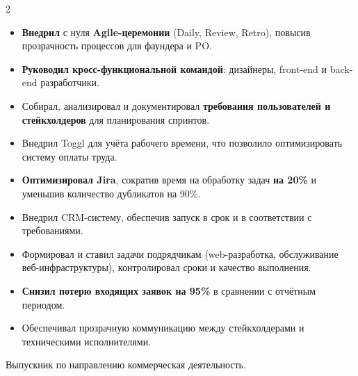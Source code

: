 \documentclass[10pt,a4paper,ragged2e,withhyper]{custom-altacv}
\begin{document}
\begin{paracol}{2}
\divider


\begin{itemize}
	\item \textbf{Внедрил} с нуля \textbf{Agile-церемонии} (Daily, Review, Retro), повысив прозрачность процессов для фаундера и PO.
    \item \textbf{Руководил кросс-функциональной командой}: дизайнеры, front-end и back-end разработчики.
    \item Собирал, анализировал и документировал \textbf{требования пользователей и стейкхолдеров }для планирования спринтов. 
    \item Внедрил Toggl для учёта рабочего времени, что позволило оптимизировать систему оплаты труда. 
    \item \textbf{Оптимизировал Jira}, сократив время на обработку задач \textbf{на 20\%} и уменьшив количество дубликатов на 90\%.
\end{itemize}

\divider

    \begin{itemize}
	\item Внедрил CRM-систему, обеспечив запуск в срок и в соответствии с требованиями. 
    \item Формировал и ставил задачи подрядчикам (web-разработка, обслуживание веб-инфраструктуры), контролировал сроки и качество выполнения.
	\item \textbf{Снизил потерю входящих заявок на 95\%} в сравнении с отчётным периодом. 
    \item Обеспечивал прозрачную коммуникацию между стейкхолдерами и техническими исполнителями. 
\end{itemize}

\switchcolumn


Выпускник по направлению коммерческая деятельность.




\end{paracol}
\end{document}

